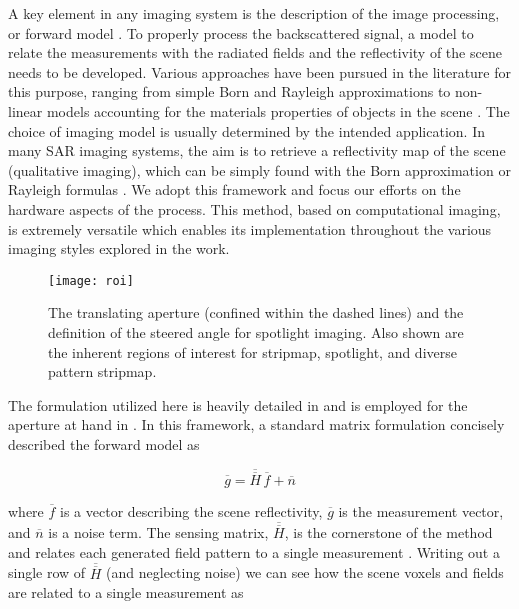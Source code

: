 \documentclass[journal]{IEEEtran}
\begin{document}
A key element in any imaging system is the description of the image processing, or forward model \cite{lipworth2013JOSA}. To properly process the backscattered signal, a model to relate the measurements with the radiated fields and the reflectivity of the scene needs to be developed. Various approaches have been pursued in the literature for this purpose, ranging from simple Born and Rayleigh approximations\cite{li2010validityBorn,lin1990invScatBorn} to non-linear models accounting for the materials properties of objects in the scene \cite{fear2002MWimaging,liu2004nonlinearRecon}. The choice of imaging model is usually determined by the intended application. In many SAR imaging systems, the aim is to retrieve a reflectivity map of the scene (qualitative imaging), which can be simply found with the Born approximation or Rayleigh formulas \cite{lin1990invScatBorn}. We adopt this framework and focus our efforts on the hardware aspects of the process. This method, based on computational imaging, is extremely versatile which enables its implementation throughout the various imaging styles explored in the work.

\begin{figure} 
	\centering
	\texttt{[image: roi]}
	\caption{\label{fig:f4}The translating aperture (confined within the dashed lines) and the definition of the steered angle for spotlight imaging. Also shown are the inherent regions of interest for stripmap, spotlight, and diverse pattern stripmap.}
\end{figure}

The formulation utilized here is heavily detailed in \cite{lipworth2013JOSA,lipworth2015virtualizer} and is employed for the aperture at hand in \cite{sleasmanMarathon}. In this framework, a standard matrix formulation concisely described the forward model as

\begin{equation}
\label{eq:eq2}
\overline{g} = \overline{\overline{H}} \, \overline{f} + \overline{n}
\end{equation}

\noindent where $\overline{f}$ is a vector describing the scene reflectivity, $\overline{g}$ is the measurement vector, and $\overline{n}$ is a noise term. The sensing matrix, $\overline{\overline{H}}$, is the cornerstone of the method and relates each generated field pattern to a single measurement \cite{lipworth2015virtualizer}. Writing out a single row of $\overline{\overline{H}}$ (and neglecting noise) we can see how the scene voxels and fields are related to a single measurement as
\end{document}
